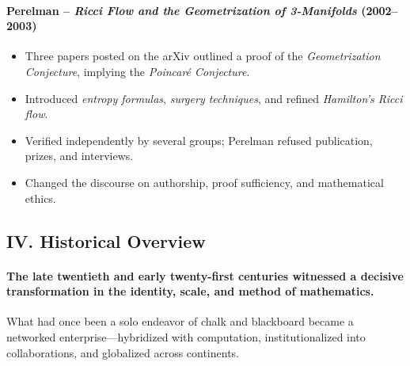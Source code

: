 \documentclass[9pt]{article}
\begin{document}
\paragraph{Perelman – \textit{Ricci Flow and the Geometrization of 3-Manifolds} (2002--2003)}
\begin{itemize}
  \item Three papers posted on the arXiv outlined a proof of the \textit{Geometrization Conjecture}, implying the \textit{Poincaré Conjecture}.
  \item Introduced \textit{entropy formulas}, \textit{surgery techniques}, and refined \textit{Hamilton’s Ricci flow}.
  \item Verified independently by several groups; Perelman refused publication, prizes, and interviews.
  \item Changed the discourse on authorship, proof sufficiency, and mathematical ethics.
\end{itemize}

\newpage

\subsection*{IV. Historical Overview}

\paragraph{The late twentieth and early twenty-first centuries witnessed a decisive transformation in the identity, scale, and method of mathematics.}

\vspace{1em}

What had once been a solo endeavor of chalk and blackboard became a networked enterprise---hybridized with computation, institutionalized into collaborations, and globalized across continents.
\end{document}
